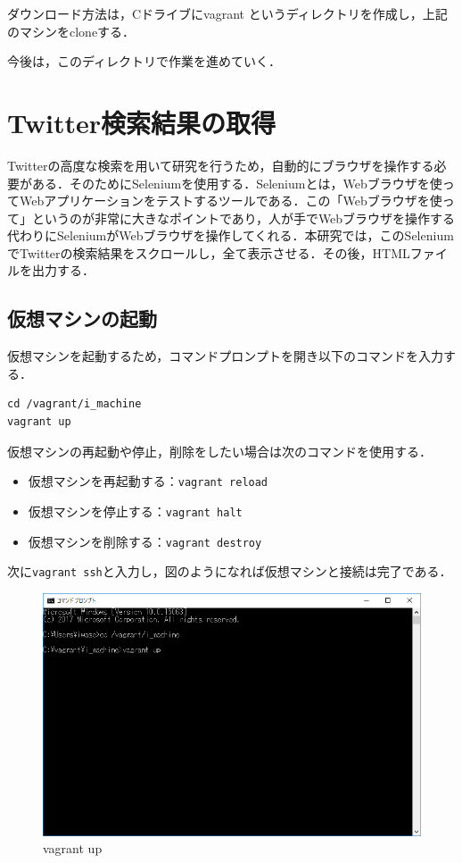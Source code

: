 ダウンロード方法は，Cドライブにvagrant というディレクトリを作成し，上記のマシンをcloneする．


今後は，このディレクトリで作業を進めていく．

\newpage



\section{Twitter検索結果の取得}
Twitterの高度な検索を用いて研究を行うため，自動的にブラウザを操作する必要がある．そのためにSeleniumを使用する．Seleniumとは，Webブラウザを使ってWebアプリケーションをテストするツールである．この「Webブラウザを使って」というのが非常に大きなポイントであり，人が手でWebブラウザを操作する代わりにSeleniumがWebブラウザを操作してくれる．本研究では，このSeleniumでTwitterの検索結果をスクロールし，全て表示させる．その後，HTMLファイルを出力する．

\subsection{仮想マシンの起動}
仮想マシンを起動するため，コマンドプロンプトを開き以下のコマンドを入力する．
\begin{lstlisting}[basicstyle=\ttfamily\footnotesize, frame=single]
cd /vagrant/i_machine
vagrant up
\end{lstlisting}

仮想マシンの再起動や停止，削除をしたい場合は次のコマンドを使用する．
\begin{itemize}
 \item 仮想マシンを再起動する：\texttt{vagrant reload}
 \item 仮想マシンを停止する：\texttt{vagrant halt}
 \item 仮想マシンを削除する：\texttt{vagrant destroy}
\end{itemize}
\newpage
次に\texttt{vagrant ssh}と入力し，図のようになれば仮想マシンと接続は完了である．
\begin{figure}[htb]
\centering
\includegraphics[width=13cm]{img/up.png}
\caption{vagrant up}
\end{figure}

